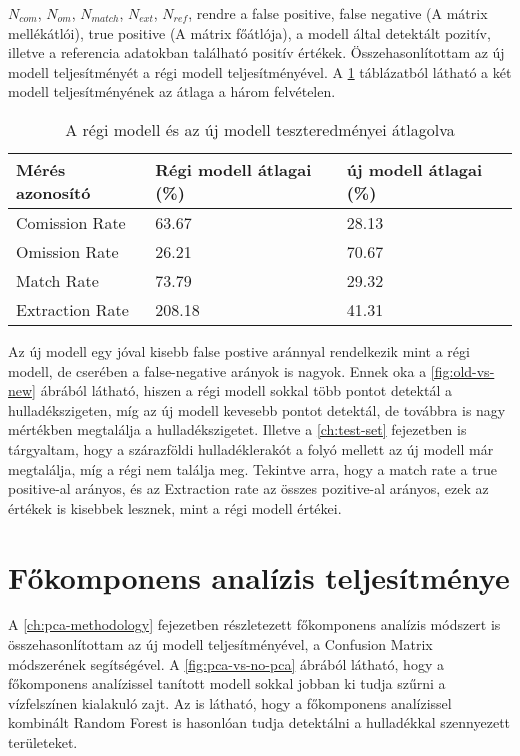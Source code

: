 $N_{com}$, $N_{om}$, $N_{match}$, $N_{ext}$, $N_{ref}$, rendre a false positive, false negative (A mátrix mellékátlói), true positive (A mátrix főátlója), a modell által detektált pozitív, illetve a referencia adatokban található positív értékek. Összehasonlítottam az új modell teljesítményét a régi modell teljesítményével. A \ref{tab:old-vs-new} táblázatból látható a két modell teljesítményének az átlaga a három felvételen.

\begin{table}[H]
	\centering
	\begin{tabular}{ | p{} | p{} | p{} | }
		\hline
		\textbf{Mérés azonosító} & \textbf{Régi modell átlagai (\%)} & \textbf{új modell átlagai (\%)} \\
		\hline \hline
		Comission Rate & 63.67 & 28.13 \\
		\hline
		Omission Rate & 26.21 & 70.67 \\
		\hline
		Match Rate & 73.79 & 29.32 \\
		\hline
        Extraction Rate & 208.18 & 41.31 \\
		\hline
	\end{tabular}
	\caption{A régi modell és az új modell teszteredményei átlagolva}
	\label{tab:old-vs-new}
\end{table}

Az új modell egy jóval kisebb false postive aránnyal rendelkezik mint a régi modell, de cserében a false-negative arányok is nagyok. Ennek oka a \ref{fig:old-vs-new} ábrából látható, hiszen a régi modell sokkal több pontot detektál a hulladékszigeten, míg az új modell kevesebb pontot detektál, de továbbra is nagy mértékben megtalálja a hulladékszigetet. Illetve a \ref{ch:test-set} fejezetben is tárgyaltam, hogy a szárazföldi hulladéklerakót a folyó mellett az új modell már megtalálja, míg a régi nem találja meg. Tekintve arra, hogy a match rate a true positive-al arányos, és az Extraction rate az összes pozitive-al arányos, ezek az értékek is kisebbek lesznek, mint a régi modell értékei.

\section{Főkomponens analízis teljesítménye}
\label{ch:pca-performance}

A \ref{ch:pca-methodology} fejezetben részletezett főkomponens analízis módszert is összehasonlítottam az új modell teljesítményével, a Confusion Matrix módszerének segítségével. A \ref{fig:pca-vs-no-pca} ábrából látható, hogy a főkomponens analízissel tanított modell sokkal jobban ki tudja szűrni a vízfelszínen kialakuló zajt. Az is látható, hogy a főkomponens analízissel kombinált Random Forest is hasonlóan tudja detektálni a hulladékkal szennyezett területeket.

